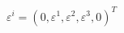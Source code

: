 \begin{equation}
\varepsilon^{i} = (0, \varepsilon^1,\varepsilon^2,\varepsilon^3 , 0)^T
\label{91}
\end{equation}

